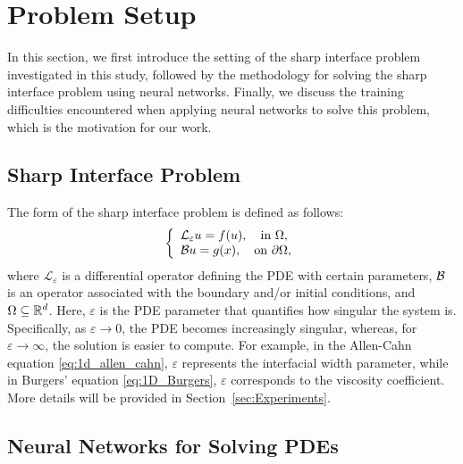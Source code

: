 \section{Problem Setup}

In this section, we first introduce the setting of the sharp interface problem investigated in this study, followed by the methodology for solving the sharp interface problem using neural networks. Finally, we discuss the training difficulties encountered when applying neural networks to solve this problem, which is the motivation for our work.
\subsection{Sharp Interface Problem}

The form of the sharp interface problem is defined as follows: 
\begin{equation}
\left\{\begin{array}{l}
\mathcal{L}_\varepsilon u=f(u), \quad  \text{in } \Omega, \\
\mathcal B u = g(x), \quad \text{on } \partial \Omega,
\end{array}\right.\label{eq:gen_pde}
\end{equation}
where $\mathcal{L}_\varepsilon$ is a differential operator defining the PDE with certain parameters, $\mathcal B$ is an operator associated with the boundary and/or initial conditions, and $\Omega \subseteq \mathbb{R}^d$.  Here, \(\varepsilon\) is the PDE parameter that quantifies how singular the system is. Specifically, as \(\varepsilon \to 0\), the PDE becomes increasingly singular, whereas, for \(\varepsilon \to \infty\), the solution is easier to compute.
 For example, in the Allen-Cahn equation \eqref{eq:1d_allen_cahn}, \( \varepsilon \) represents the interfacial width parameter, while in Burgers' equation  \eqref{eq:1D_Burgers}, \( \varepsilon \) corresponds to the viscosity coefficient. More details will be provided in Section~\ref{sec:Experiments}.
\subsection{Neural Networks for
Solving PDEs}

